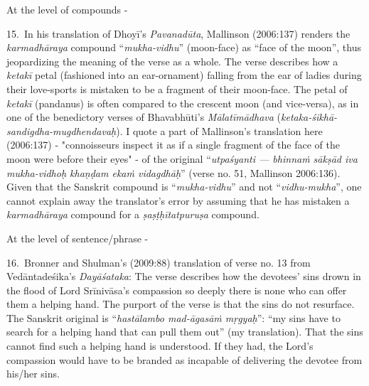 At the level of compounds -

15.~In his translation of Dhoyī’s \textsl{Pavanadūta}, Mallinson (2006:137) renders the \textsl{karmadhāraya} compound “\textsl{mukha-vidhu}” (moon-face) as “face of the moon”, thus jeopardizing the meaning of the verse as a whole. The verse describes how a \textsl{ketakī} petal (fashioned into an ear-ornament) falling from the ear of ladies during their love-sports is mistaken to be a fragment of their moon-face. The petal of \textsl{ketakī} (pandanus) is often compared to the crescent moon (and vice-versa), as in one of the benedictory verses of Bhavabhūti’s \textsl{Mālatīmādhava} (\textsl{ketaka-śikhā-sandigdha-mugdhendavaḥ}). I quote a part of Mallinson's translation here (2006:137) - "connoisseurs inspect it as if a single fragment of the face of the moon were before their eyes" - of the original “\textsl{utpaśyanti --- bhinnaṁ sākṣād iva mukha-vidhoḥ khaṇḍam ekaṁ vidagdhāḥ}” (verse no. 51, Mallinson 2006:136). Given that the Sanskrit compound is “\textsl{mukha-vidhu}” and not “\textsl{vidhu-mukha}”, one cannot explain away the translator’s error by assuming that he has mistaken a \textsl{karmadhāraya} compound for a \textsl{ṣaṣṭḥītatpuruṣa} compound. 

At the level of sentence/phrase - 

16.~Bronner and Shulman's (2009:88) translation of verse no. 13 from Vedāntadeśika’s \textsl{Dayāśataka}: The verse describes how the devotees’ sins drown in the flood of Lord Srīnivāsa’s compassion so deeply there is none who can offer them a helping hand. The purport of the verse is that the sins do not resurface. The Sanskrit original is “\textsl{hastālambo mad-āgasāṁ mṛgyaḥ}”: “my sins have to search for a helping hand that can pull them out” (my translation). That the sins cannot find such a helping hand is understood. If they had, the Lord’s compassion would have to be branded as incapable of delivering the devotee from his/her sins.


